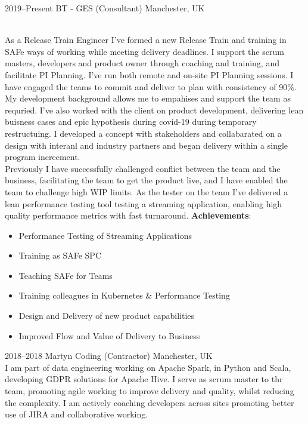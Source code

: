 \documentclass[]{cv-style}          %
\begin{document}
\begin{entrylist}
\entry
  {2019--Present}
  {BT - GES (Consultant)}
  {Manchester, UK}
  {\\
  As a Release Train Engineer I've formed a new Release Train and training in SAFe ways of working while meeting delivery deadlines.
  I support the scrum masters, developers and product owner through coaching and training, and facilitate PI Planning. I've run both remote and on-site PI Planning sessions. I have engaged the teams to commit and deliver to plan with consistency of 90\%. My development background allows me to empahises and support the team as requried.
  I've also worked with the client on product development, delivering lean buisness cases and epic hypothesis during covid-19 during temporary restructuing. I developed a concept with stakeholders and collabarated on a design with interanl and industry partners and began delivery within a single program increement.\\
  Previously I have successfully challenged conflict between the team and the business, facilitating the team to get the product live, and I have enabled the team to challenge high WIP limits.
  As the tester on the team I've delivered a lean performance testing tool testing a streaming application, enabling high quality performance metrics with fast turnaround.
  \textbf{Achievements}:
  \begin{itemize}
    \item Performance Testing of Streaming Applications
    \item Training as SAFe SPC
    \item Teaching SAFe for Teams
    \item Training colleagues in Kubernetes \& Performance Testing
    \item Design and Delivery of new product capabilities
    \item Improved Flow and Value of Delivery to Business
  \end{itemize}
  }
\entry
  {2018--2018}
  {Martyn Coding (Contractor)}
  {Manchester, UK}
  {\\
  I am part of data engineering working on Apache Spark, in Python and Scala, developing GDPR solutions for Apache Hive.
  I serve as scrum master to thr team, promoting agile working to improve delivery and quality, whilst reducing the complexity.
  I am actively coaching developers across sites promoting better use of JIRA and collaborative working.
}
\end{entrylist}
\end{document}
